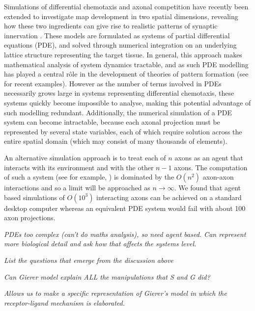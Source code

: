 \documentclass[11pt, a4paper]{article}
\begin{document}
Simulations of differential chemotaxis and axonal competition have recently been extended to investigate map development in two spatial dimensions, revealing how these two ingredients can give rise to realistic patterns of synaptic innervation \citep{james_modelling_2020}. 
These models are formulated as systems of partial differential equations (PDE), and solved through numerical integration on an underlying lattice structure representing the target tissue. 
In general, this approach makes mathematical analysis of system dynamics tractable, and as such PDE modelling has played a central r\^ole in the development of theories of pattern formation (see \citet{krause_modern_2021} for recent examples). 
However as the number of terms involved in PDEs necessarily grows large in systems representing differential chemotaxis, these systems quickly become impossible to analyse, making this potential advantage of such modelling redundant.
Additionally, the numerical simulation of a PDE system can become intractable, because each axonal projection must be represented by several state variables, each of which require solution across the entire spatial domain (which may consist of many thousands of elements).

An alternative simulation approach is to treat each of $n$ axons as an agent that interacts with its environment and with the other $n-1$ axons. 
The computation of such a system (see for example, \citet{simpson_simple_2011}) is dominated by the $O(n^2)$ axon-axon interactions and so a limit will be approached as $n\rightarrow \infty$. 
We found that agent based simulations of $O(10^3)$ interacting axons can be achieved on a standard desktop computer whereas an equivalent PDE system would fail with about 100 axon projections.

\emph{PDEs too complex (can't do maths analysis), so need agent based. Can represent more biological detail and ask how that affects the systems level.}

\emph{List the questions that emerge from the discussion above}

\emph{Can Gierer model explain ALL the manipulations that S and G did?}

\emph{Allows us to make a specific representation of Gierer's model in which the receptor-ligand mechanism is elaborated.}
\end{document}

